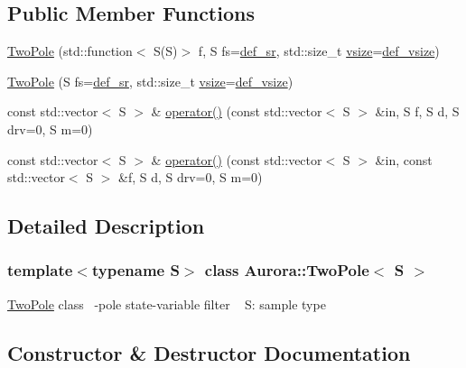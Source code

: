 \subsection*{Public Member Functions}
\begin{DoxyCompactItemize}
\item 
\hyperlink{class_aurora_1_1_two_pole_a0545f0b722b88873bb798b6c0f2112e8}{Two\+Pole} (std\+::function$<$ S(S)$>$ f, S fs=\hyperlink{namespace_aurora_ad49263d809bea98dd422e95bc91bc03e}{def\+\_\+sr}, std\+::size\+\_\+t \hyperlink{class_aurora_1_1_snd_base_af9e21aaf411b17f7a8221c991ce5d291}{vsize}=\hyperlink{namespace_aurora_afaaddf667a06e7ce23c667a8b7295263}{def\+\_\+vsize})
\item 
\hyperlink{class_aurora_1_1_two_pole_afb7af09d7f8a80b18d875e78f4bcb419}{Two\+Pole} (S fs=\hyperlink{namespace_aurora_ad49263d809bea98dd422e95bc91bc03e}{def\+\_\+sr}, std\+::size\+\_\+t \hyperlink{class_aurora_1_1_snd_base_af9e21aaf411b17f7a8221c991ce5d291}{vsize}=\hyperlink{namespace_aurora_afaaddf667a06e7ce23c667a8b7295263}{def\+\_\+vsize})
\item 
const std\+::vector$<$ S $>$ \& \hyperlink{class_aurora_1_1_two_pole_a7582c69b4c221f81f25c650d9c643157}{operator()} (const std\+::vector$<$ S $>$ \&in, S f, S d, S drv=0, S m=0)
\item 
const std\+::vector$<$ S $>$ \& \hyperlink{class_aurora_1_1_two_pole_a860a443654a353bb8c40927f8a45aa46}{operator()} (const std\+::vector$<$ S $>$ \&in, const std\+::vector$<$ S $>$ \&f, S d, S drv=0, S m=0)
\end{DoxyCompactItemize}


\subsection{Detailed Description}
\subsubsection*{template$<$typename S$>$\newline
class Aurora\+::\+Two\+Pole$<$ S $>$}

\hyperlink{class_aurora_1_1_two_pole}{Two\+Pole} class ~-\/pole state-\/variable filter ~\newline
S\+: sample type 

\subsection{Constructor \& Destructor Documentation}
\mbox{\label{class_aurora_1_1_two_pole_a0545f0b722b88873bb798b6c0f2112e8}} 
